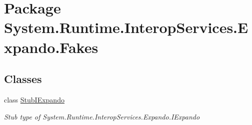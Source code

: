 \hypertarget{namespace_system_1_1_runtime_1_1_interop_services_1_1_expando_1_1_fakes}{\section{Package System.\-Runtime.\-Interop\-Services.\-Expando.\-Fakes}
\label{namespace_system_1_1_runtime_1_1_interop_services_1_1_expando_1_1_fakes}
}
\subsection*{Classes}
\begin{DoxyCompactItemize}
\item 
class \hyperlink{class_system_1_1_runtime_1_1_interop_services_1_1_expando_1_1_fakes_1_1_stub_i_expando}{Stub\-I\-Expando}
\begin{DoxyCompactList}\small\item\em Stub type of System.\-Runtime.\-Interop\-Services.\-Expando.\-I\-Expando\end{DoxyCompactList}\end{DoxyCompactItemize}
